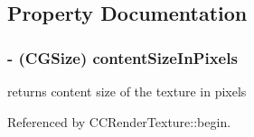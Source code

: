 \subsection{Property Documentation}
\hypertarget{class_c_c_texture2_d_a4df3800d331389f083bf2044023a2831}{
\subsubsection[{content\-Size\-In\-Pixels}]{\setlength{\rightskip}{0pt plus 5cm}-\/ (C\-G\-Size) {\bf content\-Size\-In\-Pixels}}}\label{class_c_c_texture2_d_a4df3800d331389f083bf2044023a2831}
returns content size of the texture in pixels 

Referenced by C\-C\-Render\-Texture\-::begin.

